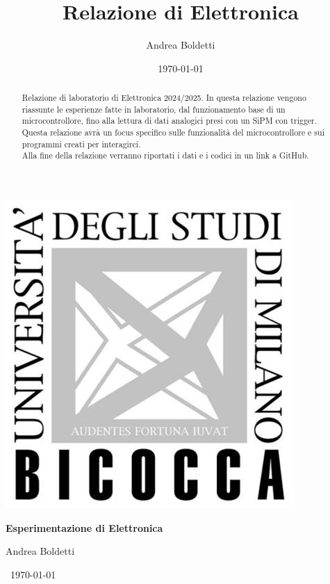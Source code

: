 \documentclass[a4paper]{article}
\title{Relazione di Elettronica}
\author{Andrea Boldetti}
\date{\today}
\begin{document}
\includegraphics[left]{Logo Bicocca.jpeg}

\begin{center}
        {\fontsize{23pt}{23pt}\selectfont\bfseries{}\selectfont Esperimentazione di Elettronica \par}
        \vspace{1cm} %
        {\fontsize{17pt}{22pt}\selectfont{}\selectfont Andrea Boldetti \par}

        \vspace{1cm}
        {\centering\fontsize{20pt}{20pt}\selectfont{}\selectfont \ \today \par}
\end{center}
 \vspace{5cm}

\begin{abstract}
Relazione di laboratorio di Elettronica 2024/2025. In questa relazione vengono riassunte le esperienze fatte in laboratorio, dal funzionamento base di un microcontrollore, fino alla lettura di dati analogici presi con un SiPM con trigger.\\
Questa relazione avrà un focus specifico sulle funzionalità del microcontrollore e sui programmi creati per interagirci.\\
Alla fine della relazione verranno riportati i dati e i codici in un link a GitHub.
\end{abstract}

\newpage
{
    \hypersetup{linkcolor=black}
    \tableofcontents
}
\newpage









\end{document}
